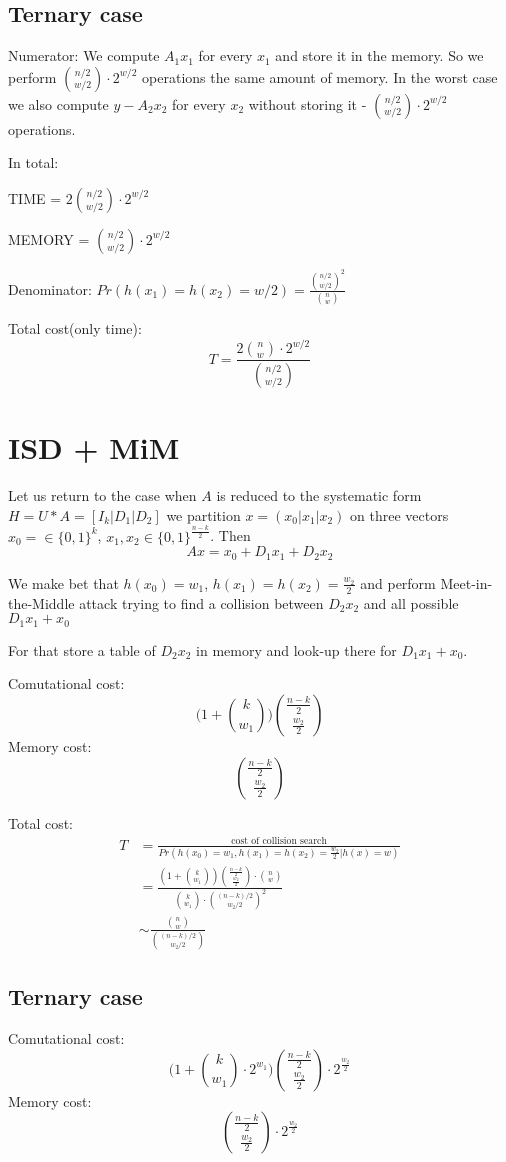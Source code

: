 \documentclass[12pt]{article}
\begin{document}
\subsection{Ternary case}
Numerator:
We compute $A_1x_1$ for every $x_1$ and store it in the memory. So we perform $\binom{n/2}{w/2} \cdot 2^{w/2}$ operations the same amount of memory. In the worst case we also compute $y - A_2x_2$ for every $x_2$ without storing it - $\binom{n/2}{w/2} \cdot 2^{w/2}$ operations.

In total:

TIME = $2\binom{n/2}{w/2} \cdot 2^{w/2}$

MEMORY = $\binom{n/2}{w/2} \cdot 2^{w/2}$

Denominator:
$Pr(h(x_1) = h(x_2) = w/2) = \frac{\binom{n/2}{w/2}^{2}}{\binom{n}{w}}$

Total cost(only time):
\[
  T = \frac{2\binom{n}{w} \cdot 2^{w/2}}{\binom{n/2}{w/2}}
\]
\section{ISD + MiM}
Let us return to the case when $A$ is reduced to the systematic form $H = U * A = [I_{k}| D_1 | D_2]$ we partition $x = (x_0 |x_1 |x_2)$ on three vectors $x_0 = \in \{0,1\}^{k}$, $x_1,x_2 \in \{0,1\}^{\frac{n-k}{2}}$. Then
\[
  Ax = x_0 + D_1x_1 + D_2x_2
\]

We make bet that $h(x_0) = w_1$, $h(x_1) = h(x_2) = \frac{w_2}{2}$ and perform Meet-in-the-Middle attack trying to find a collision between $D_2x_2$ and all possible $D_1x_1 + x_0$

For that store a table of $D_2x_2$ in memory and look-up there for $D_1x_1 + x_0$.

Comutational cost:
\[
\Big(1+ \binom{k}{w_1}\Big)\binom{\frac{n-k}{2}}{\frac{w_2}{2}}
\]
Memory cost:
\[
\binom{\frac{n-k}{2}}{\frac{w_2}{2}}
\]

Total cost:
\[
\begin{split}
  T & = \frac{\text{cost of collision search}}{Pr(h(x_0) = w_1, h(x_1) = h(x_2) = \frac{w_2}{2} | h(x) = w)} \\
  & = \frac{(1+ \binom{k}{w_1})\binom{\frac{n-k}{2}}{\frac{w_2}{2}}\cdot \binom{n}{w}}{\binom{k}{w_1} \cdot \binom{(n-k)/2}{w_2/2}^{2}} \\
  & \sim \frac{\binom{n}{w}}{\binom{(n-k)/2}{w_2/2}}
\end{split}
\]
\subsection{Ternary case}
Comutational cost:
\[
\Big(1+ \binom{k}{w_1} \cdot 2^{w_1}\Big)\binom{\frac{n-k}{2}}{\frac{w_2}{2}} \cdot 2^{\frac{w_2}{2}}
\]
Memory cost:
\[
\binom{\frac{n-k}{2}}{\frac{w_2}{2}} \cdot 2^{\frac{w_2}{2}}
\]
\end{document}
